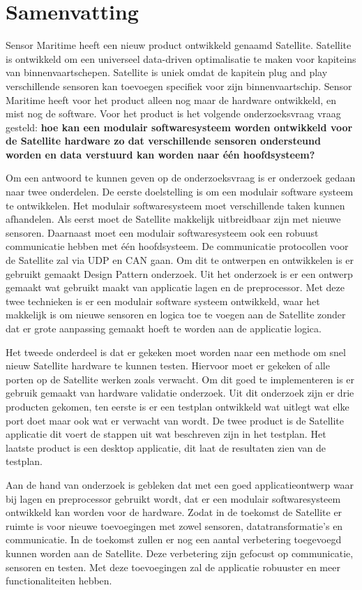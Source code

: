 \chapter*{Samenvatting}
Sensor Maritime heeft een nieuw product ontwikkeld genaamd Satellite. Satellite is ontwikkeld om een universeel data-driven optimalisatie te maken voor kapiteins van binnenvaartschepen. Satellite is uniek omdat de kapitein plug and play verschillende sensoren kan toevoegen specifiek voor zijn binnenvaartschip. Sensor Maritime heeft voor het product alleen nog maar de hardware ontwikkeld, en mist nog de software. Voor het product is het volgende onderzoeksvraag vraag gesteld: \textbf{hoe kan een modulair softwaresysteem worden ontwikkeld voor de Satellite hardware zo dat verschillende sensoren ondersteund worden en data verstuurd kan worden naar één hoofdsysteem?} \newline

\noindent Om een antwoord te kunnen geven op de onderzoeksvraag is er onderzoek gedaan naar twee onderdelen. De eerste doelstelling is om een modulair software systeem te ontwikkelen. Het modulair softwaresysteem moet verschillende taken kunnen afhandelen. Als eerst moet de Satellite makkelijk uitbreidbaar zijn met nieuwe sensoren. Daarnaast moet een modulair softwaresysteem ook een robuust communicatie hebben met één hoofdsysteem. De communicatie protocollen voor de Satellite zal via UDP en CAN gaan. Om dit te ontwerpen en ontwikkelen is er gebruikt gemaakt Design Pattern onderzoek. Uit het onderzoek is er een ontwerp gemaakt wat gebruikt maakt van applicatie lagen en de preprocessor. Met deze twee technieken is er een modulair software systeem ontwikkeld, waar het makkelijk is om nieuwe sensoren en logica toe te voegen aan de Satellite zonder dat er grote aanpassing gemaakt hoeft te worden aan de applicatie logica. \newline

\noindent Het tweede onderdeel is dat er gekeken moet worden naar een methode om snel nieuw Satellite hardware te kunnen testen. Hiervoor moet er gekeken of alle porten op de Satellite werken zoals verwacht. Om dit goed te implementeren is er gebruik gemaakt van hardware validatie onderzoek. Uit dit onderzoek zijn er drie producten gekomen, ten eerste is er een testplan ontwikkeld wat uitlegt wat elke port doet maar ook wat er verwacht van wordt. De twee product is de Satellite applicatie dit voert de stappen uit wat beschreven zijn in het testplan. Het laatste product is een desktop applicatie, dit laat de resultaten zien van de testplan. \newline


\noindent Aan de hand van onderzoek is gebleken dat met een goed applicatieontwerp waar bij lagen en preprocessor gebruikt wordt, dat er een modulair softwaresysteem ontwikkeld kan worden voor de hardware. Zodat in de toekomst de Satellite er ruimte is voor nieuwe toevoegingen met zowel sensoren, datatransformatie's en communicatie. In de toekomst zullen er nog een aantal verbetering toegevoegd kunnen worden aan de Satellite. Deze verbetering zijn gefocust op communicatie, sensoren en testen. Met deze toevoegingen zal de applicatie robuuster en meer functionaliteiten hebben.
